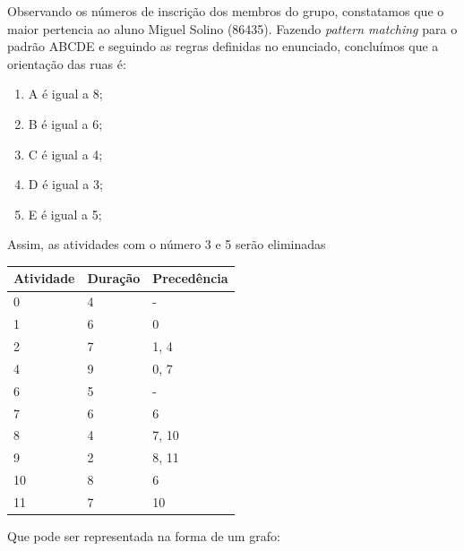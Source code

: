 \documentclass[a4paper]{report}
\begin{document}
Observando os números de inscrição dos membros do grupo, constatamos
que o maior pertencia ao aluno Miguel Solino (86435).
Fazendo \textit{pattern matching} para o padrão ABCDE e seguindo as
regras definidas no enunciado, concluímos que a orientação das ruas é:

\begin{enumerate}
    \item A é igual a 8;
    \item B é igual a 6;
    \item C é igual a 4;
    \item D é igual a 3;
    \item E é igual a 5;
\end{enumerate}
Assim, as atividades com o número 3 e 5 serão eliminadas 

\begin{table}[H]
    \centering
    \begin{tabular}{|l|l|l|}
        \hline
        Atividade & Duração & Precedência \\ \hline
        0         & 4       & -           \\ \hline
        1         & 6       & 0           \\ \hline
        2         & 7       & 1, 4        \\ \hline
        4         & 9       & 0, 7        \\ \hline
        6         & 5       & -           \\ \hline
        7         & 6       & 6           \\ \hline
        8         & 4       & 7, 10       \\ \hline
        9         & 2       & 8, 11       \\ \hline
        10        & 8       & 6           \\ \hline
        11        & 7       & 10          \\ \hline
    \end{tabular}
\end{table}
Que pode ser representada na forma de um grafo:
\end{document}

